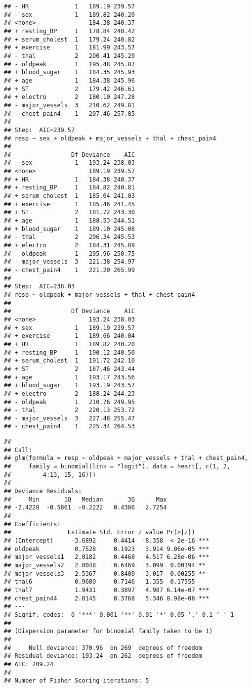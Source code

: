 \documentclass[]{article}
\begin{document}
\begin{verbatim}
## - HR             1   189.19 239.57
## - sex            1   189.82 240.20
## <none>               184.38 240.37
## + resting_BP     1   178.84 240.42
## + serum_cholest  1   179.24 240.82
## + exercise       1   181.99 243.57
## - thal           2   200.41 245.20
## - oldpeak        1   195.48 245.87
## + blood_sugar    1   184.35 245.93
## + age            1   184.38 245.96
## + ST             2   179.42 246.61
## + electro        2   180.10 247.28
## - major_vessels  3   210.62 249.81
## - chest_pain4    1   207.46 257.85
## 
## Step:  AIC=239.57
## resp ~ sex + oldpeak + major_vessels + thal + chest_pain4
## 
##                 Df Deviance    AIC
## - sex            1   193.24 238.03
## <none>               189.19 239.57
## + HR             1   184.38 240.37
## + resting_BP     1   184.82 240.81
## + serum_cholest  1   185.04 241.03
## + exercise       1   185.46 241.45
## + ST             2   181.72 243.30
## + age            1   188.53 244.51
## + blood_sugar    1   189.10 245.08
## - thal           2   206.34 245.53
## + electro        2   184.31 245.89
## - oldpeak        1   205.96 250.75
## - major_vessels  3   221.38 254.97
## - chest_pain4    1   221.20 265.99
## 
## Step:  AIC=238.03
## resp ~ oldpeak + major_vessels + thal + chest_pain4
## 
##                 Df Deviance    AIC
## <none>               193.24 238.03
## + sex            1   189.19 239.57
## + exercise       1   189.66 240.04
## + HR             1   189.82 240.20
## + resting_BP     1   190.12 240.50
## + serum_cholest  1   191.72 242.10
## + ST             2   187.46 243.44
## + age            1   193.17 243.56
## + blood_sugar    1   193.19 243.57
## + electro        2   188.24 244.23
## - oldpeak        1   210.76 249.95
## - thal           2   220.13 253.72
## - major_vessels  3   227.48 255.47
## - chest_pain4    1   225.34 264.53
\end{verbatim}

\begin{verbatim}
## 
## Call:
## glm(formula = resp ~ oldpeak + major_vessels + thal + chest_pain4, 
##     family = binomial(link = "logit"), data = heart[, c(1, 2, 
##         4:13, 15, 16)])
## 
## Deviance Residuals: 
##     Min       1Q   Median       3Q      Max  
## -2.4228  -0.5861  -0.2222   0.4386   2.7254  
## 
## Coefficients:
##                Estimate Std. Error z value Pr(>|z|)    
## (Intercept)     -3.6892     0.4414  -8.358  < 2e-16 ***
## oldpeak          0.7528     0.1923   3.914 9.06e-05 ***
## major_vessels1   2.0182     0.4468   4.517 6.28e-06 ***
## major_vessels2   2.0048     0.6469   3.099  0.00194 ** 
## major_vessels3   2.5367     0.8409   3.017  0.00255 ** 
## thal6            0.9680     0.7146   1.355  0.17555    
## thal7            1.9431     0.3897   4.987 6.14e-07 ***
## chest_pain44     2.0145     0.3768   5.346 8.98e-08 ***
## ---
## Signif. codes:  0 '***' 0.001 '**' 0.01 '*' 0.05 '.' 0.1 ' ' 1
## 
## (Dispersion parameter for binomial family taken to be 1)
## 
##     Null deviance: 370.96  on 269  degrees of freedom
## Residual deviance: 193.24  on 262  degrees of freedom
## AIC: 209.24
## 
## Number of Fisher Scoring iterations: 5
\end{verbatim}
\end{document}
